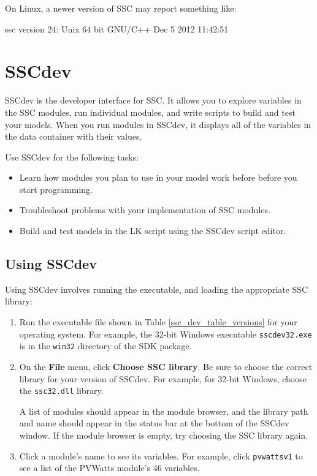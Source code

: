 \documentclass{article}
\begin{document}
On Linux, a newer version of SSC may report something like:
\begin{verbatimtab}[4]
	ssc version 24: Unix 64 bit GNU/C++ Dec  5 2012 11:42:51
\end{verbatimtab}

\section{SSCdev}
\label{sec_sscdev}

SSCdev is the developer interface for SSC. It allows you to explore variables in the SSC modules, run individual modules, and write scripts to build and test your models. When you run modules in SSCdev, it displays all of the variables in the data container with their values.

Use SSCdev for the following tasks:

\begin{itemize}
\item Learn how modules you plan to use in your model work before before you start programming.
\item Troubleshoot problems with your implementation of SSC modules.
\item Build and test models in the LK script using the SSCdev script editor.
\end{itemize}

\subsection{Using SSCdev}
\label{sec_sscdev_run}

Using SSCdev involves running the executable, and loading the appropriate SSC library:

\begin{enumerate}
\item Run the executable file shown in Table \ref{ssc_dev_table_versions} for your operating system. For example, the 32-bit Windows executable \texttt{sscdev32.exe} is in the \texttt{win32} directory of the SDK package.
\item On the \textbf{File} menu, click \textbf{Choose SSC library}. Be sure to choose the correct library for your version of SSCdev. For example, for 32-bit Windows, choose the \texttt{ssc32.dll} library.

A list of modules should appear in the module browser, and the library path and name should appear in the status bar at the bottom of the SSCdev window. If the module browser is empty, try choosing the SSC library again.
\item Click a module's name to see its variables. For example, click \texttt{pvwattsv1} to see a list of the PVWatts module's 46 variables.
\end{enumerate}
\end{document}
